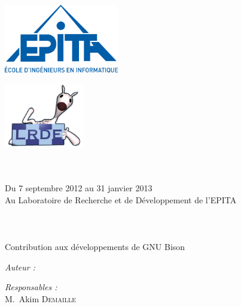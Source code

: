 
\begin{titlepage}

\begin{center}
\begin{minipage}[t]{0.48\textwidth}
  \begin{flushleft}
    \includegraphics [width=50mm]{images/logo-epita.png} \\[0.5cm]
    \begin{spacing}{1.5}
    \end{spacing}
  \end{flushleft}
\end{minipage}
\begin{minipage}[t]{0.48\textwidth}
  \begin{flushright}
    \includegraphics [width=35mm]{images/logo-lrde.png} \\[0.5cm]
  \end{flushright}
\end{minipage} \\[1.5cm]

\textsc{\Large \reportsubject}\\[0.5cm]
{\large Du 7 septembre 2012 au 31 janvier 2013}\\[0.1cm]
{\large Au Laboratoire de Recherche et de Développement de l'EPITA}\\[0.5cm]
\HRule \\[0.4cm]
{\huge \bfseries \reporttitle}\\[0.4cm]
\HRule \\[1.5cm]

{\large Contribution aux développements de GNU Bison}\\[1.0cm]

\begin{minipage}[t]{0.3\textwidth}
  \begin{flushleft} \large
    \emph{Auteur :}\\
    \reportauthor
  \end{flushleft}
\end{minipage}
\begin{minipage}[t]{0.6\textwidth}
  \begin{flushright} \large
    \emph{Responsables :} \\
    M.~Akim \textsc{Demaille} \\
  \end{flushright}
\end{minipage}


\end{center}
\end{titlepage}
